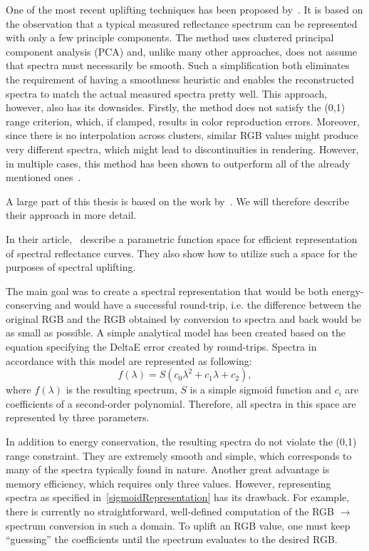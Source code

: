 One of the most recent uplifting techniques has been proposed by~\citet{upsamplingOtsu}. It is based on the observation that a typical measured reflectance spectrum can be represented with only a few principle components. The method uses clustered principal component analysis (PCA) and, unlike many other approaches, does not assume that spectra must necessarily be smooth. Such a simplification both eliminates the requirement of having a smoothness heuristic and enables the reconstructed spectra to match the actual measured spectra pretty well. This approach, however, also has its downsides. Firstly, the method does not satisfy the (0,1) range criterion, which, if clamped, results in color reproduction errors. Moreover, since there is no interpolation across clusters, similar RGB values might produce very different spectra, which might lead to discontinuities in rendering. However, in multiple cases, this method has been shown to outperform all of the already mentioned ones~\cite{upsamplingJakobHanika}.

A large part of this thesis is based on the work by~\citet{upsamplingJakobHanika}. We will therefore describe their approach in more detail.

In their article,~\citet{upsamplingJakobHanika} describe a parametric function space for efficient representation of spectral reflectance curves. They also show how to utilize such a space for the purposes of spectral uplifting.

The main goal was to create a spectral representation that would be both energy-conserving and would have a successful round-trip, i.e. the difference between the original RGB and the RGB obtained by conversion to spectra and back would be as small as possible. A simple analytical model has been created based on the equation specifying the DeltaE error created by round-trips. Spectra in accordance with this model are represented as following:
\begin{equation} \label{sigmoidRepresentation}
f(\lambda)=S(c_{0}\lambda^2+c_{1}\lambda+c_{2}),
\end{equation}
where $f(\lambda)$ is the resulting spectrum, $S$ is a simple sigmoid function and $c_{i}$ are coefficients of a second-order polynomial. Therefore, all spectra in this space are represented by three parameters.

In addition to energy conservation, the resulting spectra do not violate the (0,1) range constraint. They are extremely smooth and simple, which corresponds to many of the spectra typically found in nature. Another great advantage is memory efficiency, which requires only three values. However, representing spectra as specified in~\ref{sigmoidRepresentation} has its drawback. For example, there is currently no straightforward, well-defined computation of the RGB $\to$ spectrum conversion in such a domain. To uplift an RGB value, one must keep ``guessing'' the coefficients until the spectrum evaluates to the desired RGB.

